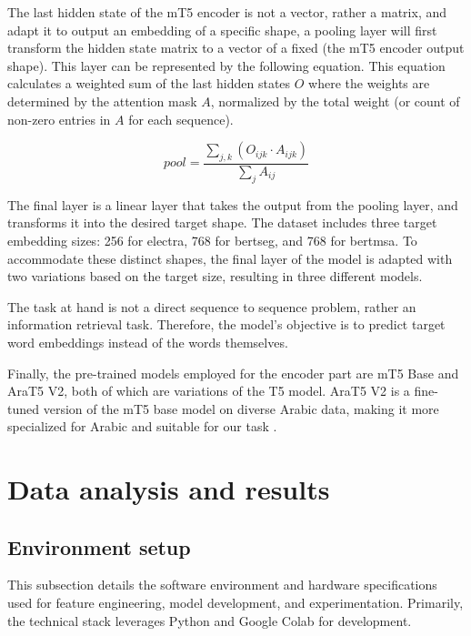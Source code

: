 \documentclass[12.5pt]{article}
\begin{document}
The last hidden state of the mT5 encoder is not a vector, rather a matrix, and adapt it to output an embedding of a specific shape, a pooling layer will first transform the hidden state matrix to a vector of a fixed (the mT5 encoder output shape). This layer can be represented by the following equation. This equation calculates a weighted sum of the last hidden states \(O\) where the weights are determined by the attention mask \(A\), normalized by the total weight (or count of non-zero entries in \(A\) for each sequence).

\begin{equation}
    pool = \frac{\sum_{j,k} (O_{ijk} \cdot A_{ijk})}{\sum_j A_{ij}}
\end{equation}

The final layer is a linear layer that takes the output from the pooling layer, and transforms it into the desired target shape. The dataset includes three target embedding sizes: 256 for electra, 768 for bertseg, and 768 for bertmsa. To accommodate these distinct shapes, the final layer of the model is adapted with two variations based on the target size, resulting in three different models.

The task at hand is not a direct sequence to sequence problem, rather an information retrieval task. Therefore, the model's objective is to predict target word embeddings instead of the words themselves.

Finally, the pre-trained models employed for the encoder part are mT5 Base and AraT5 V2, both of which are variations of the T5 model. AraT5 V2 is a fine-tuned version of the mT5 base model on diverse Arabic data, making it more specialized for Arabic and suitable for our task \cite{Nagoudi2021}.

\newpage

\section{Data analysis and results}

\subsection{Environment setup}

This subsection details the software environment and hardware specifications used for feature engineering, model development, and experimentation. Primarily, the technical stack leverages Python and Google Colab for development.
\end{document}
